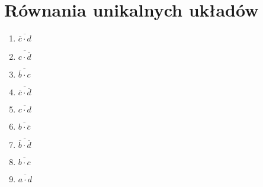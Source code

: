 \documentclass[10pt,a4paper]{article}
\newcommand{\ol}[1]{\overline{#1}}
\begin{document}
\section*{Równania unikalnych układów}

\begin{multicols}{3}
  \begin{enumerate}
    \item $\ol{\ol{c} \cdot d}$
    \item $\ol{c \cdot \ol{d}}$
    \item $\ol{\ol{b} \cdot c}$
    \item $\ol{\ol{c} \cdot \ol{d}}$
    \item $\ol{c \cdot d}$
    \item $\ol{b \cdot \ol{c}}$
    \item $\ol{\ol{b} \cdot \ol{d}}$
    \item $\ol{b \cdot c}$
    \item $\ol{a \cdot d}$
  \end{enumerate}
\end{multicols}




\end{document}
